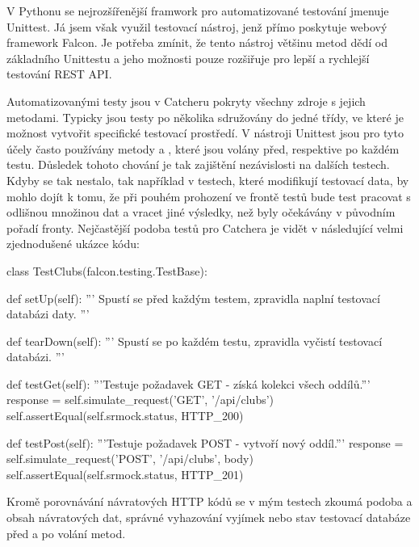\medskip

V Pythonu se nejrozšířenější framwork pro automatizované testování jmenuje Unittest. Já jsem však využil testovací nástroj, jenž přímo
poskytuje webový framework Falcon. Je potřeba zmínit, že tento nástroj většinu metod dědí od základního Unittestu a jeho možnosti pouze
rozšiřuje pro lepší a rychlejší testování REST API.

\medskip

Automatizovanými testy jsou v Catcheru pokryty všechny zdroje s jejich metodami. Typicky jsou testy po několika sdružovány do jedné třídy,
ve které je možnost vytvořit specifické testovací prostředí. V nástroji Unittest jsou pro tyto účely často používány metody  a ,
které jsou volány před, respektive po každém testu. Důsledek tohoto chování je tak zajištění nezávislosti na dalších testech.
Kdyby se tak nestalo, tak například v testech, které modifikují testovací data, by mohlo dojít k tomu, že při pouhém prohození ve frontě testů
bude test pracovat s odlišnou množinou dat a vracet jiné výsledky, než byly očekávány v původním pořadí fronty. Nejčastější podoba testů pro Catchera
je vidět v následující velmi zjednodušené ukázce kódu: 

\begin{python}
class TestClubs(falcon.testing.TestBase):

    def setUp(self):
      '''
      Spustí se před každým testem,
      zpravidla naplní testovací databázi daty.
      '''

    def tearDown(self):
      '''
      Spustí se po každém testu,
      zpravidla vyčistí testovací databázi.
      '''

    def testGet(self):
      '''Testuje požadavek GET - získá kolekci všech oddílů.'''     
      response = self.simulate_request('GET', '/api/clubs')
      self.assertEqual(self.srmock.status, HTTP_200)

    def testPost(self):
      '''Testuje požadavek POST - vytvoří nový oddíl.'''
      response = self.simulate_request('POST', '/api/clubs', body)
      self.assertEqual(self.srmock.status, HTTP_201)
\end{python}

Kromě porovnávání návratových HTTP kódů se v mým testech zkoumá podoba a obsah návratových dat, správné vyhazování vyjímek
nebo stav testovací databáze před a po volání metod.